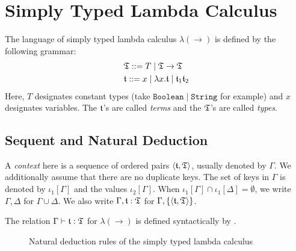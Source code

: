 \section{Simply Typed Lambda Calculus}

The language of simply typed lambda calculus $\lambda(\rightarrow)$ is defined by the following grammar:
\begin{align*}
    &\mathfrak{T} ::= T \mid \mathfrak{T} \rightarrow \mathfrak{T} \\
    &\mathfrak{t} ::= x \mid \lambda x. \mathfrak{t} \mid \mathfrak{t}_1 \mathfrak{t}_2
\end{align*}
Here, $T$ designates constant types (take $\mathtt{Boolean} \mid \mathtt{String}$ for example) and $x$ designates variables. The $\mathfrak{t}$'s are called \textit{terms} and the $\mathfrak{T}$'s are called \textit{types}.

\subsection{Sequent and Natural Deduction}

A \textit{context} here is a sequence of ordered pairs $\left\langle \mathfrak{t}, \mathfrak{T} \right\rangle$, usually denoted by $\Gamma$. We additionally assume that there are no duplicate keys. The set of keys in $\Gamma$ is denoted by $\iota_1[\Gamma]$ and the values $\iota_2[\Gamma]$. When $\iota_1[\Gamma] \cap \iota_1[\Delta] = \emptyset$, we write $\Gamma, \Delta$ for $\Gamma \cup \Delta$. We also write $\Gamma, \mathfrak{t}: \mathfrak{T}$ for $\Gamma, \{\left\langle \mathfrak{t}, \mathfrak{T} \right\rangle\}$.

\begin{definition}
The relation $\Gamma \vdash \mathfrak{t} : \mathfrak{T}$ for $\lambda(\rightarrow)$ is defined syntactically by .
\end{definition}

\begin{figure}
    \centering
    
    \caption{Natural deduction rules of the simply typed lambda calculus}
    \label{fig:simply-typed-lambda-calculus-natural-deduction}
\end{figure}
